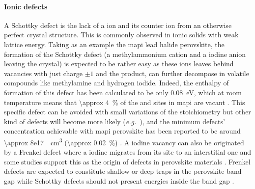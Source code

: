 \paragraph{Ionic defects}
	A Schottky defect is the lack of a ion and its counter ion from an otherwise perfect crystal structure.
	This is commonly observed in ionic solids with weak lattice energy.
	Taking as an example the \gls{mapi} lead halide perovskite, the formation of the Schottky defect  (a methylammonium cation and a iodine anion leaving the crystal) is expected to be rather easy as these ions leaves behind vacancies with just charge $\pm 1$ and the product,  can further decompose in volatile compounds like methylamine and hydrogen iodide.
	Indeed, the enthalpy of formation of this defect has been calculated to be only \SI{0.08}{\eV}, which at room temperature means that \SI{\approx 4}{\%} of the  and  sites in \gls{mapi} are vacant \cite{Walsh2015,Yin2014}.
	This specific defect can be avoided with small variations of the stoichiometry but other kind of defects will become more likely (\textsl{e.g.}\ ), and the minimum defects' concentration achievable with \gls{mapi} perovskite has been reported to be around \SI{\approx 8e17}{\per\cubic\cm} (\SI{\approx 0.02}{\%}) \cite{Walsh2015}.
	A iodine vacancy can also be originated by a Frenkel defect where a iodine migrates from its site to an interstitial one  and some studies support this as the origin of defects in perovskite materials \cite{Birkhold2018,Birkhold2018a,Minns2017,Mosconi2016,Uratani2017}.
	Frenkel defects are expected to constitute shallow or deep traps in the perovskite band gap while Schottky defects should not present energies inside the band gap \cite{Kim2014h,Yin2014,Buin2014,Du2015}.

